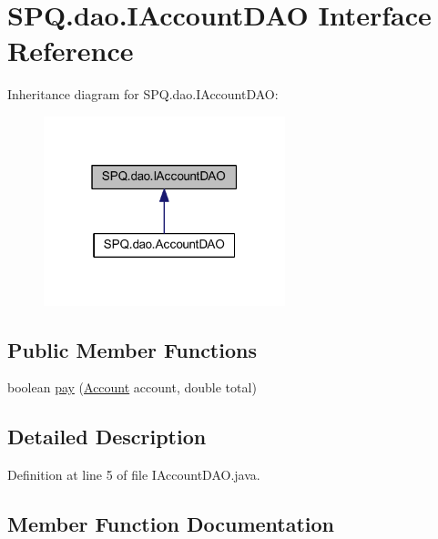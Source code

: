 \hypertarget{interface_s_p_q_1_1dao_1_1_i_account_d_a_o}{}\section{S\+P\+Q.\+dao.\+I\+Account\+D\+AO Interface Reference}
\label{interface_s_p_q_1_1dao_1_1_i_account_d_a_o}


Inheritance diagram for S\+P\+Q.\+dao.\+I\+Account\+D\+AO\+:
\nopagebreak
\begin{figure}[H]
\begin{center}
\leavevmode
\includegraphics[width=199pt]{interface_s_p_q_1_1dao_1_1_i_account_d_a_o__inherit__graph}
\end{center}
\end{figure}
\subsection*{Public Member Functions}
\begin{DoxyCompactItemize}
\item 
boolean \mbox{\hyperlink{interface_s_p_q_1_1dao_1_1_i_account_d_a_o_aa1e3f13d419f23fc0cb5c98cd4cc5eb4}{pay}} (\mbox{\hyperlink{class_s_p_q_1_1data_1_1_account}{Account}} account, double total)
\end{DoxyCompactItemize}


\subsection{Detailed Description}


Definition at line 5 of file I\+Account\+D\+A\+O.\+java.



\subsection{Member Function Documentation}
\mbox{\label{interface_s_p_q_1_1dao_1_1_i_account_d_a_o_aa1e3f13d419f23fc0cb5c98cd4cc5eb4}} 
